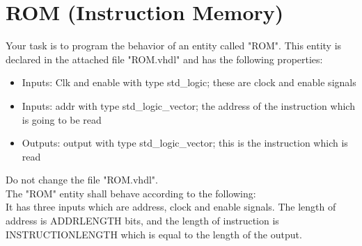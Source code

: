 \documentclass[a4paper,12pt]{article}
\begin{document}
\pagestyle{empty}
\setlength{\parindent}{0em}
\section*{ROM (Instruction Memory)}


Your task is to program the behavior of an entity called "ROM". This entity is declared in the attached file "ROM.vhdl" and has the following properties:
\begin{itemize}
\item Inputs: Clk and enable with type std\_logic; these are clock and enable signals
\item Inputs: addr with type std\_logic\_vector; the address of the instruction which is going to be read
\item Outputs: output with type std\_logic\_vector; this is the instruction which is read
\end{itemize}
\vspace{0.3cm}
\begin{center}
\end{center}

Do not change the file "ROM.vhdl".\\

The "ROM" entity shall behave according to the following:\\

It has three inputs which are address, clock and enable signals. The length of address is {{ADDRLENGTH}} bits, and the length of instruction is {{INSTRUCTIONLENGTH}} which is equal to the length of the output. \\
\end{document}
